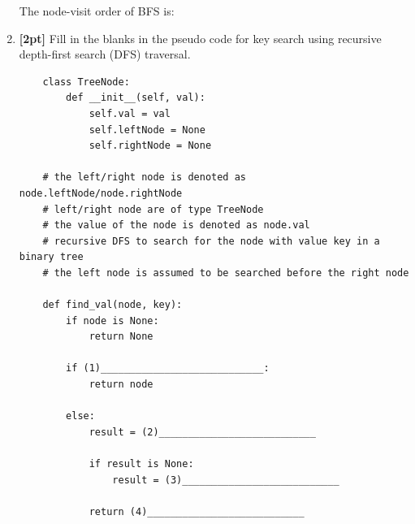 \documentclass[12pt]{article}
\begin{document}
\begin{enumerate}
    The node-visit order of BFS is:
    
    \begin{tcolorbox}[fit,height=1cm, width=\textwidth, blank, borderline={1pt}{-2pt},nobeforeafter]
    \end{tcolorbox}
    
    
    \clearpage

    \item \textbf{[2pt]} Fill in the blanks in the pseudo code for key search using recursive depth-first search (DFS) traversal.
    
    \begin{verbatim}
    class TreeNode:
        def __init__(self, val):
            self.val = val
            self.leftNode = None
            self.rightNode = None
        
    # the left/right node is denoted as node.leftNode/node.rightNode
    # left/right node are of type TreeNode
    # the value of the node is denoted as node.val
    # recursive DFS to search for the node with value key in a binary tree
    # the left node is assumed to be searched before the right node
        
    def find_val(node, key):
        if node is None:
            return None
            
        if (1)____________________________:
            return node
            
        else:
            result = (2)___________________________
            
            if result is None:
                result = (3)___________________________
                
            return (4)___________________________
                
    \end{verbatim}
    
    
    

    \clearpage
\end{enumerate}
\end{document}
